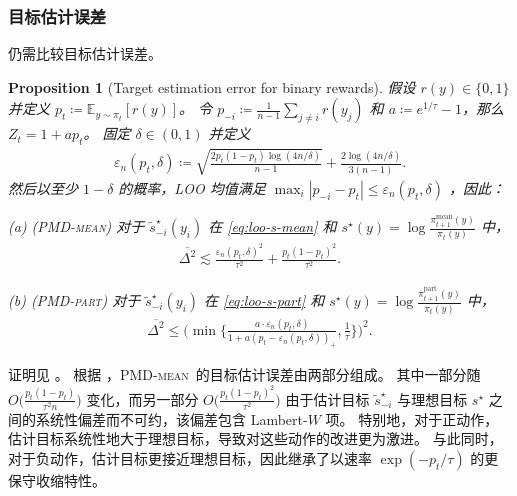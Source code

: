 \documentclass{article}
\theoremstyle{plain}
\newtheorem{proposition}[theorem]{Proposition}
\theoremstyle{definition}
\theoremstyle{remark}
\newcommand{\E}{\mathbb{E}}
\newcommand{\abs}[1]{\left|#1\right|}
\begin{document}
\subsubsection{目标估计误差}
仍需比较目标估计误差。 
\begin{proposition}[Target estimation error for binary rewards]
    \label{prop:tgt_err_clean}
    假设 $r(y)\in\{0,1\}$ 并定义 $p_t\coloneqq \E_{y\sim\pi_t}[r(y)]$。  
令 $p_{-i}\coloneqq \frac{1}{n-1}\sum_{j\neq i} r(y_j)$ 和 $a\coloneqq e^{1/\tau}-1$，那么 $Z_t=1+a p_t$。  
固定 $\delta\in(0,1)$ 并定义
    \begin{align*}
        \varepsilon_n(p_t,\delta)
        \coloneqq
        \sqrt{\frac{2p_t(1-p_t)\log(4n/\delta)}{n-1}}
        +
        \frac{2\log(4n/\delta)}{3(n-1)}.
    \end{align*}
    然后以至少 $1-\delta$ 的概率，LOO 均值满足 $\max_i \abs{p_{-i}-p_t}\leq \varepsilon_n(p_t,\delta)$ ，因此： 

    (a) (\textsc{PMD-mean}) 对于 $\widetilde{s}^\star_{-i}(y_i)$ 在 \eqref{eq:loo-s-mean} 和 $s^\star(y)=\log\frac{\pi^\mathrm{mean}_{t+1}(y)}{\pi_t(y)}$ 中，
        \begin{align}
        \label{eq:tgt_err_mean_clean}
            \overline{\Delta^2}
            \lesssim
            \frac{\varepsilon_n(p_t,\delta)^2}{\tau^2} + \frac{p_t(1-p_t)^2}{\tau^2}.
        \end{align}

      (b) (\textsc{PMD-part}) 对于 $\widetilde{s}^\star_{-i}(y_i)$  在 \eqref{eq:loo-s-part} 和 $s^\star(y)=\log\frac{\pi^\mathrm{part}_{t+1}(y)}{\pi_t(y)}$ 中，
        \begin{align}\label{eq:tgt_err_part_clean}
            \overline{\Delta^2}
            \leq\biggl(\min\biggl\{\frac{a\cdot\varepsilon_n(p_t,\delta)}{1+a(p_t-\varepsilon_n(p_t,\delta))_+}, \frac{1}{\tau}\biggr\}\biggr)^2.
        \end{align}
\end{proposition}
证明见 。  
根据 ，\textsc{PMD-mean}\ 的目标估计误差由两部分组成。  
其中一部分随 $O\bigl(\frac{p_t(1-p_t)}{\tau^2 n}\bigr)$ 变化，而另一部分 $O\bigl(\frac{p_t(1-p_t)^2}{\tau^2}\bigr)$ 由于估计目标 $\widetilde{s}_{-i}^\star$ 与理想目标 $s^\star$ 之间的系统性偏差而不可约，该偏差包含 Lambert-$W$ 项。  
特别地，对于正动作，估计目标系统性地大于理想目标，导致对这些动作的改进更为激进。  
与此同时，对于负动作，估计目标更接近理想目标，因此继承了以速率 $\exp(-p_t/\tau)$ 的更保守收缩特性。 
\end{document}
